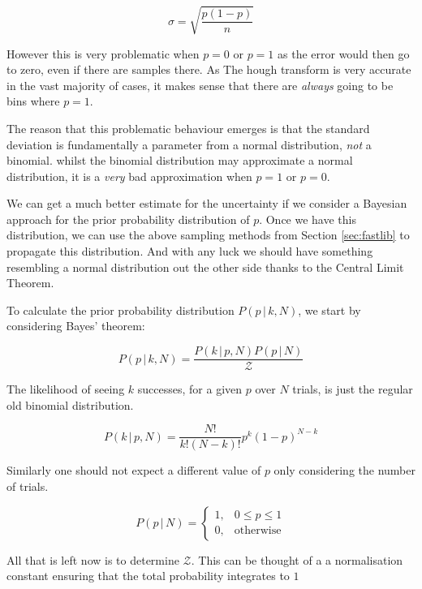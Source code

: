 \documentclass[10pt, a4paper]{article}
\begin{document}
\begin{equation}
 \sigma = \sqrt{\frac{p(1-p)}{n}}
\end{equation}

However this is very problematic when $p=0$ or $p=1$ as the error would then go to zero, even if there are samples there. As The hough transform is very accurate in the vast majority of cases, it makes sense that there are \emph{always} going to be bins where $p=1$. 

The reason that this problematic behaviour emerges is that the standard deviation is fundamentally a parameter from a normal distribution, \emph{not} a binomial. whilst the binomial distribution may approximate a normal distribution, it is a \emph{very} bad approximation when $p=1$ or $p=0$.

We can get a much better estimate for the uncertainty if we consider a Bayesian approach for the prior probability distribution of $p$. Once we have this distribution, we can use the above sampling methods from Section \ref{sec:fastlib} to propagate this distribution. And with any luck we should have something resembling a normal distribution out the other side thanks to the Central Limit Theorem.

To calculate the prior probability distribution $P(p\,|\,k,N)$, we start by considering Bayes' theorem:

\begin{equation}
 P(p\,|\,k,N) = \frac{ P(k \,|\,p,N)  P(p\,|\,N) }{\mathcal{Z}}
 \label{eqn:binom1}
\end{equation}

The likelihood of seeing $k$ successes, for a given $p$ over $N$ trials, is just the regular old binomial distribution.

\begin{equation}
 P(k \,|\,p,N) = \frac{N!}{k!(N-k)!}p^k(1-p)^{N-k}
\end{equation}

Similarly one should not expect a different value of $p$ only considering the number of trials. 

\begin{equation}
 P(p \,|\,N) = \begin{cases}1 ,& 0 \leq p \leq 1 \\ 0 ,& \text{otherwise} \end{cases}
\end{equation}

All that is left now is to determine $\mathcal{Z}$. This can be thought of a a normalisation constant ensuring that the total probability integrates to $1$
\end{document}
